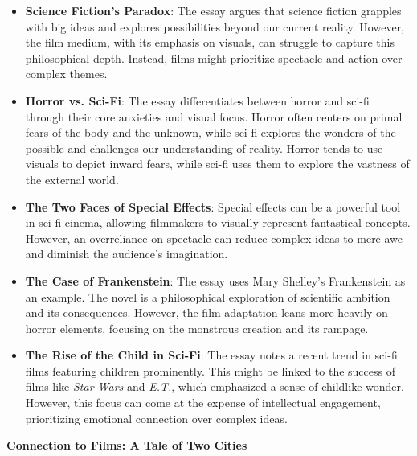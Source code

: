 \documentclass[11pt,fleqn]{book}
\begin{document}
\begin{itemize}
\item \textbf{Science Fiction's Paradox}: The essay argues that science fiction grapples with big ideas and explores possibilities beyond our current reality. However, the film medium, with its emphasis on visuals, can struggle to capture this philosophical depth. Instead, films might prioritize spectacle and action over complex themes.

\item \textbf{Horror vs. Sci-Fi}: The essay differentiates between horror and sci-fi through their core anxieties and visual focus. Horror  often centers on primal fears of the body and the unknown, while sci-fi explores the wonders of the possible and challenges our understanding of reality. Horror tends to use visuals to depict inward fears, while sci-fi uses them to explore the vastness of the external world.

\item \textbf{The Two Faces of Special Effects}: Special effects can be a powerful tool in sci-fi cinema, allowing filmmakers to visually represent fantastical concepts. However, an overreliance on spectacle can reduce complex ideas to mere awe and diminish the audience's imagination. 

\item \textbf{The Case of Frankenstein}: The essay uses Mary Shelley's Frankenstein as an example. The novel is a philosophical exploration of scientific ambition and its consequences. However, the film adaptation leans more heavily on horror elements, focusing on the monstrous creation and its rampage.

\item \textbf{The Rise of the Child in Sci-Fi}: The essay notes a recent trend in sci-fi films featuring children prominently. This might be linked to the success of films like\textit{ Star Wars} and \textit{E.T.}, which emphasized a sense of childlike wonder. However, this focus can come at the expense of intellectual engagement, prioritizing emotional connection over complex ideas.
\end{itemize}
\vspace{5pt}
\textbf{Connection to Films: A Tale of Two Cities}
\end{document}
